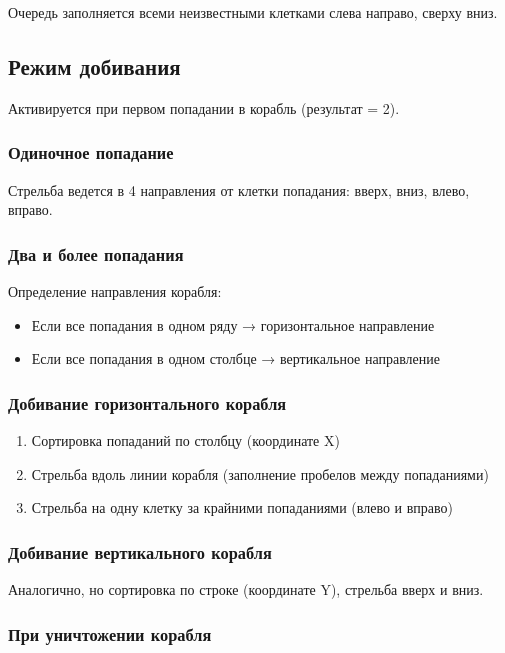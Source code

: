 \documentclass[oneside,a4paper,14pt]{extarticle}
\begin{document}
Очередь заполняется всеми неизвестными клетками слева направо, сверху вниз.

\subsection*{Режим добивания}

Активируется при первом попадании в корабль (результат = 2).

\subsubsection*{Одиночное попадание}

Стрельба ведется в 4 направления от клетки попадания: вверх, вниз, влево, вправо.

\subsubsection*{Два и более попадания}

Определение направления корабля:
\begin{itemize}
  \item[$-$] Если все попадания в одном ряду → горизонтальное направление
  \item[$-$] Если все попадания в одном столбце → вертикальное направление
\end{itemize}

\subsubsection*{Добивание горизонтального корабля}

\begin{enumerate}
  \item Сортировка попаданий по столбцу (координате X)
  \item Стрельба вдоль линии корабля (заполнение пробелов между попаданиями)
  \item Стрельба на одну клетку за крайними попаданиями (влево и вправо)
\end{enumerate}

\subsubsection*{Добивание вертикального корабля}

Аналогично, но сортировка по строке (координате Y), стрельба вверх и вниз.

\subsubsection*{При уничтожении корабля}
\end{document}
